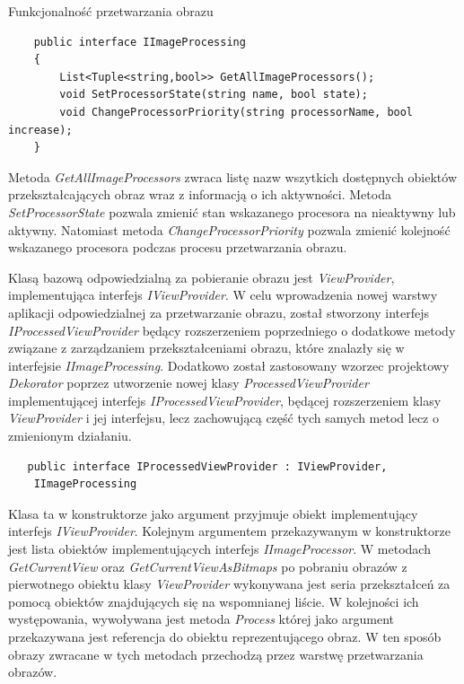 \documentclass[a4paper,11pt,twoside]{report}
\theoremstyle{definition}
\begin{document}
\begin{description}


\begin{minipage}{\linewidth}
\item [Funkcjonalność przetwarzania obrazu] \hfill \\

\lstset{style=sharpc}
\begin{lstlisting}
    public interface IImageProcessing
    {
        List<Tuple<string,bool>> GetAllImageProcessors();
        void SetProcessorState(string name, bool state);
        void ChangeProcessorPriority(string processorName, bool increase);
    }
\end{lstlisting}
\end{minipage}

Metoda \textit{GetAllImageProcessors} zwraca listę nazw wszytkich dostępnych obiektów przekształcających obraz wraz z informacją o ich aktywności.
Metoda \textit{SetProcessorState} pozwala zmienić stan wskazanego procesora na nieaktywny lub aktywny.
Natomiast metoda \textit{ChangeProcessorPriority} pozwala zmienić kolejność wskazanego procesora podczas procesu przetwarzania obrazu. 

Klasą bazową odpowiedzialną za pobieranie obrazu jest \textit{ViewProvider}, implementująca interfejs \textit{IViewProvider}. W celu wprowadzenia nowej warstwy aplikacji odpowiedzialnej za przetwarzanie obrazu, został stworzony interfejs \textit{IProcessedViewProvider} będący rozszerzeniem poprzedniego o dodatkowe metody związane z zarządzaniem przekształceniami obrazu, które znalazły się w interfejsie \textit{IImageProcessing}. Dodatkowo został zastosowany wzorzec projektowy \textit{Dekorator} poprzez utworzenie nowej klasy \textit{ProcessedViewProvider} implementującej interfejs \textit{IProcessedViewProvider}, będącej rozszerzeniem klasy \textit{ViewProvider} i jej interfejsu, lecz zachowującą część tych samych metod lecz o zmienionym działaniu.

\lstset{style=sharpc}
\begin{lstlisting}
   public interface IProcessedViewProvider : IViewProvider, 
	IImageProcessing
\end{lstlisting}

Klasa ta w konstruktorze jako argument przyjmuje obiekt implementujący interfejs \textit{IViewProvider}. Kolejnym argumentem przekazywanym w konstruktorze jest lista obiektów implementujących interfejs \textit{IImageProcessor}. W metodach \textit{GetCurrentView} oraz \textit{GetCurrentViewAsBitmaps} po pobraniu obrazów z pierwotnego obiektu klasy \textit{ViewProvider} wykonywana jest seria przekształceń za pomocą obiektów znajdujących się na wspomnianej liście. W kolejności ich występowania, wywoływana jest metoda \textit{Process} której jako argument przekazywana jest referencja do obiektu reprezentującego obraz. W ten sposób obrazy zwracane w tych metodach przechodzą przez warstwę przetwarzania obrazów.


\end{description}
\end{document}
